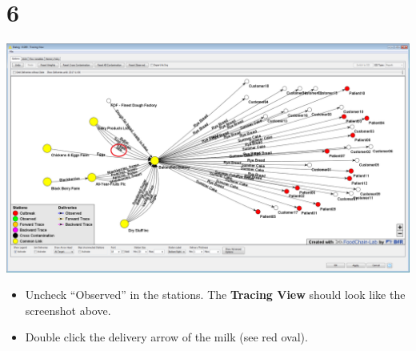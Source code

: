 \documentclass[10pt]{beamer}
\begin{document}
\section{6}
\begin{frame}
	\begin{center}
  		\includegraphics[height=0.6\textheight]{6.png}
	\end{center}
	\begin{itemize}
		\item Uncheck “Observed” in the stations. The \textbf{Tracing View} should look like the screenshot above.
		\item Double click the delivery arrow of the milk (see red oval).
	\end{itemize}
\end{frame}
\end{document}
